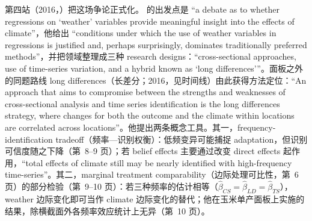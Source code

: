 第四站（2016，）把这场争论正式化。\citet{hsiang2016climate} 的出发点是 ``a debate as to whether regressions on `weather' variables provide meaningful insight into the effects of climate''\citep[第~2 页]{hsiang2016climate}，他给出 ``conditions under which the use of weather variables in regressions is justified and, perhaps surprisingly, dominates traditionally preferred methods''\citep[第~2 页]{hsiang2016climate}，并把领域整理成三种 research designs：``cross-sectional approaches, use of time-series variation, and a hybrid known as `long differences'''\citep[第~5 页]{hsiang2016climate}。面板之外的同题路线 long differences（长差分；2016，见时间线）由此获得方法定位：``An approach that aims to compromise between the strengths and weaknesses of cross-sectional analysis and time series identification is the long differences strategy, where changes for both the outcome and the climate within locations are correlated across locations''\citep[第~7 页]{hsiang2016climate}。他提出两条概念工具。其一，frequency-identification tradeoff（频率—识别权衡）：低频变异可能捕捉 adaptation，但识别可信度随之下降（第~8--9 页）；若 belief effects 主要通过改变 direct effects 起作用，``total effects of climate still may be nearly identified with high-frequency time-series''\citep[第~9 页]{hsiang2016climate}。其二，marginal treatment comparability（边际处理可比性，第~6 页）的部分检验（第~9--10 页）：若三种频率的估计相等（$\hat\beta_{CS}=\hat\beta_{LD}=\hat\beta_{TS}$），weather 边际变化即可当作 climate 边际变化的替代；他在玉米单产面板上实施的结果，除横截面外各频率效应统计上无异（第~10 页）。

